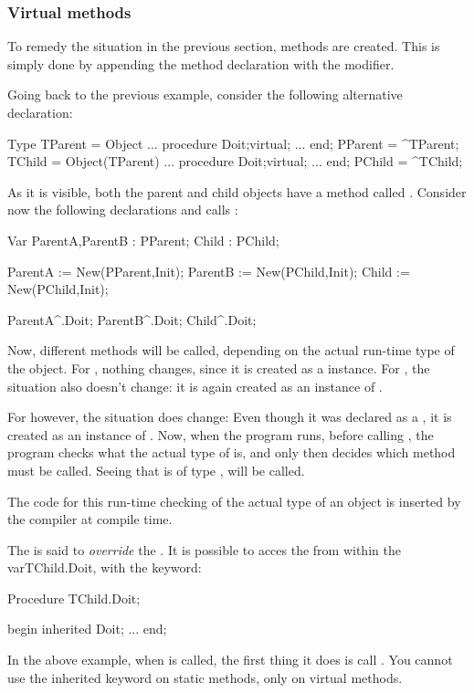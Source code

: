 \documentclass{report}
\begin{document}
\subsubsection{Virtual methods}

To remedy the situation in the previous section,  methods are
created. This is simply done by appending the method declaration with the
 modifier.

Going back to the previous example, consider the following alternative
declaration:
\begin{listing}
Type
  TParent = Object 
    ...
    procedure Doit;virtual;
    ...
    end;
  PParent = ^TParent;
  TChild = Object(TParent) 
    ...
    procedure Doit;virtual;
    ...
    end;
  PChild = ^TChild;  
\end{listing}
As it is visible, both the parent and child objects have a method called
. Consider now the following declarations and calls :
\begin{listing}
Var ParentA,ParentB : PParent;
    Child           : PChild;

   ParentA := New(PParent,Init);
   ParentB := New(PChild,Init);
   Child := New(PChild,Init);

   ParentA^.Doit;
   ParentB^.Doit;
   Child^.Doit;
\end{listing}
Now, different methods will be called, depending on the actual run-time type
of the object. For , nothing changes, since it is created as
a  instance. For , the situation also doesn't
change: it is again created as an instance of .

For  however, the situation does change: Even though it was
declared as a , it is created as an instance of .
Now, when the program runs, before calling , the program
checks what the actual type of  is, and only then decides which
method must be called. Seeing that  is of type ,
 will be called.

The code for this run-time checking of the actual type of an object is
inserted by the compiler at compile time.

The  is said to {\em override} the .
It is possible to acces the  from within the
var{TChild.Doit}, with the  keyword:
\begin{listing}
Procedure TChild.Doit;

begin
  inherited Doit; 
  ...
end;
\end{listing}
In the above example, when  is called, the first thing it
does is call . You cannot use the inherited keyword on 
static methods, only on virtual methods.
\end{document}
